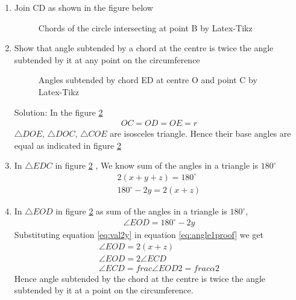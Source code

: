 \renewcommand{\theequation}{\theenumi}
\begin{enumerate}[label=\thesection.\arabic*.,ref=\thesection.\theenumi]

\item Join CD as shown in the figure below
\begin{figure}[!ht]
\centering
\resizebox{\columnwidth}{!}{}
\caption{Chords of the circle intersecting at point B by Latex-Tikz}
\label{fig:intersecting_chords}	
\end{figure}

\item Show that angle subtended by a chord at the centre is twice the angle subtended by it at any point on the circumference
\begin{figure}[!ht]
\centering
\resizebox{\columnwidth}{!}{}
\caption{Angles subtended by chord ED at centre O and point C by Latex-Tikz}
\label{fig:chord_proof}	
\end{figure}
Solution:
\newline
In the figure \ref{fig:chord_proof}	
\begin{align}
OC = OD = OE = r
\end{align}
\implies $\triangle DOE$, $\triangle DOC$, $\triangle COE$ are isosceles triangle.
\newline
Hence their base angles are equal as indicated in figure \ref{fig:chord_proof}

\item In $\triangle EDC$ in figure \ref{fig:chord_proof} , We know sum of the angles in a triangle is $180^{\circ}$
\begin{align}
2(x+y+z) = 180^{\circ}
\\
180^{\circ} - 2y = 2(x+z)
\label{eq:val2y}
\end{align}

\item In $\triangle EOD$ in figure \ref{fig:chord_proof} as sum of the angles in a triangle is $180^{\circ}$,
\begin{align}
\angle EOD = 180^{\circ} - 2y
\label{eq:angle1proof}
\end{align}
Substituting equation \ref{eq:val2y} in equation \ref{eq:angle1proof} we get 
\begin{align}
\angle EOD = 2(x+z)
\\
\angle EOD = 2 \angle ECD
\\
\angle ECD = frac{\angle EOD}{2} = frac{\alpha}{2}
\label{eq:angle1}
\end{align}
Hence angle subtended by the chord at the centre is twice the angle subtended by it at a point on the circumference.


\end{enumerate}
